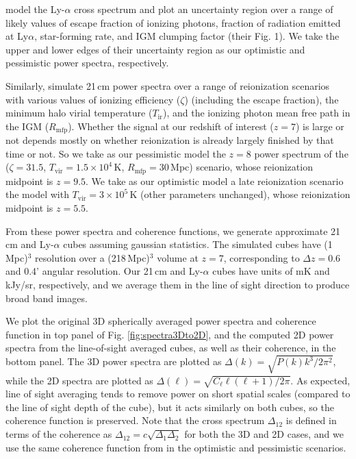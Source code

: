 \documentclass{emulateapj}
\begin{document}
\citet{Gong2014} model the Ly-$\alpha$ cross spectrum and plot an uncertainty region over a range of likely values of escape fraction of ionizing photons, fraction of radiation emitted at Ly$\alpha$, star-forming rate, and IGM clumping factor (their Fig. 1). We take the upper and lower edges of their uncertainty region as our optimistic and pessimistic power spectra, respectively. 

Similarly, \citet{PoberNextGen} simulate 21\,cm power spectra over a range of reionization scenarios with various values of ionizing efficiency ($\zeta$) (including the escape fraction), the minimum halo virial temperature ($T_\text{ir}$), and the ionizing photon mean free path in the IGM ($R_\text{mfp}$). Whether the signal at our redshift of interest ($z=7$) is large or not depends mostly on whether reionization is already largely finished by that time or not. So we take as our pessimistic model the $z=8$ power spectrum of the ($\zeta =31.5$, $T_\text{vir}=1.5\times10^4$\,K, $R_\text{mfp}=30$\,Mpc) scenario, whose reionization midpoint is $z=9.5$. We take as our optimistic model a late reionization scenario the model with $T_\text{vir}=3\times10^5$\,K (other parameters unchanged), whose reionization midpoint is $z=5.5$. 

From these power spectra and coherence functions, we generate approximate 21\,cm and Ly-$\alpha$ cubes assuming gaussian statistics. The simulated cubes have (1\,Mpc)$^3$ resolution over a (218\,Mpc)$^3$ volume at $z=7$, corresponding to $\Delta z=0.6$ and 0.4' angular resolution. Our 21\,cm and Ly-$\alpha$ cubes have units of mK and kJy/sr, respectively, and we average them in the line of sight direction to produce broad band images.

We plot the original 3D spherically averaged power spectra and coherence function in top panel of Fig. \ref{fig:spectra3Dto2D}, and the computed 2D power spectra from the line-of-sight averaged cubes, as well as their coherence, in the bottom panel. The 3D power spectra are plotted as $\Delta(k)=\sqrt{P(k)k^3/2\pi^2}$, while the 2D spectra are plotted as $\Delta(\ell)=\sqrt{C_\ell \ell(\ell+1)/2\pi}$. As expected, line of sight averaging tends to remove power on short spatial scales (compared to the line of sight depth of the cube), but it acts similarly on both cubes, so the coherence function is preserved. Note that the cross spectrum $\Delta_{12}$ is defined in terms of the coherence as $\Delta_{12}=c\sqrt{\Delta_1\Delta_2}$ for both the 3D and 2D cases, and we use the same coherence function from \citet{Heneka2016} in the optimistic and pessimistic scenarios.
\end{document}
